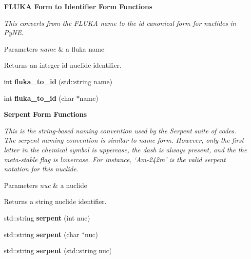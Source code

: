 \begin{Indent}{\bf F\-L\-U\-K\-A Form to Identifier Form Functions}\par
{\em This converts from the F\-L\-U\-K\-A name to the id canonical form for nuclides in Py\-N\-E. 
\begin{DoxyParams}{Parameters}
{\em name} & a fluka name \\
\hline
\end{DoxyParams}
\begin{DoxyReturn}{Returns}
an integer id nuclide identifier. 
\end{DoxyReturn}
}\begin{DoxyCompactItemize}
\item 
\hypertarget{namespacepyne_1_1nucname_a9938dd663fa7160312e033ea088423b8}{int {\bfseries fluka\-\_\-to\-\_\-id} (std\-::string name)}\label{namespacepyne_1_1nucname_a9938dd663fa7160312e033ea088423b8}

\item 
\hypertarget{namespacepyne_1_1nucname_a5df41bf3c3d1b907a89c49a2485b6b68}{int {\bfseries fluka\-\_\-to\-\_\-id} (char $\ast$name)}\label{namespacepyne_1_1nucname_a5df41bf3c3d1b907a89c49a2485b6b68}

\end{DoxyCompactItemize}
\end{Indent}
\begin{Indent}{\bf Serpent Form Functions}\par
{\em This is the string-\/based naming convention used by the Serpent suite of codes. The serpent naming convention is similar to name form. However, only the first letter in the chemical symbol is uppercase, the dash is always present, and the the meta-\/stable flag is lowercase. For instance, ‘\-Am-\/242m’ is the valid serpent notation for this nuclide. 
\begin{DoxyParams}{Parameters}
{\em nuc} & a nuclide \\
\hline
\end{DoxyParams}
\begin{DoxyReturn}{Returns}
a string nuclide identifier. 
\end{DoxyReturn}
}\begin{DoxyCompactItemize}
\item 
\hypertarget{namespacepyne_1_1nucname_add93b13ec55e918550681062e48e1fd2}{std\-::string {\bfseries serpent} (int nuc)}\label{namespacepyne_1_1nucname_add93b13ec55e918550681062e48e1fd2}

\item 
\hypertarget{namespacepyne_1_1nucname_aea4d37bd112080cafb72d7e56fc2c555}{std\-::string {\bfseries serpent} (char $\ast$nuc)}\label{namespacepyne_1_1nucname_aea4d37bd112080cafb72d7e56fc2c555}

\item 
\hypertarget{namespacepyne_1_1nucname_a6c17212425ae2bc60437fa5c96f0b8de}{std\-::string {\bfseries serpent} (std\-::string nuc)}\label{namespacepyne_1_1nucname_a6c17212425ae2bc60437fa5c96f0b8de}

\end{DoxyCompactItemize}
\end{Indent}

